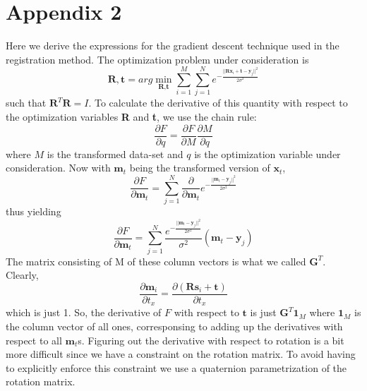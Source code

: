 \documentclass[11pt, a4paper]{article}
\begin{document}
\section*{Appendix 2}
Here we derive the expressions for the gradient descent technique used in the registration method.
\linebreak \linebreak
\noindent The optimization problem under consideration is $$\textbf{R}, \textbf{t} = arg\min_{\textbf{R}, \textbf{t}} \sum_{i=1}^M \sum_{j=1}^N e^{-\frac{|| \textbf{Rx}_i + \textbf{t} - \textbf{y}_j ||^2}{2 \sigma^2}}$$ such that $\textbf{R}^T \textbf{R} = I$. To calculate the derivative of this quantity with respect to the optimization variables \textbf{R} and \textbf{t}, we use the chain rule:
$$\frac{\partial F}{\partial q} = \frac{\partial F}{\partial M} \frac{\partial M}{\partial q}$$ where $M$ is the transformed data-set and $q$ is the optimization variable under consideration. Now with $\textbf{m}_t$ being the transformed version of $\textbf{x}_t$, $$\frac{\partial F}{\partial \textbf{m}_t} = \sum_{j=1}^N \frac{\partial}{\partial \textbf{m}_t} e^{-\frac{|| \textbf{m}_t - \textbf{y}_j ||^2}{2 \sigma^2}}$$ thus yielding $$\frac{\partial F}{\partial \textbf{m}_t} = \sum_{j=1}^N \frac{e^{-\frac{|| \textbf{m}_t - \textbf{y}_j ||^2}{2 \sigma^2}}}{\sigma^2} \left( \textbf{m}_t-\textbf{y}_j \right)$$ The matrix consisting of M of these column vectors is what we called $\textbf{G}^T$.
\newline \linebreak
\noindent Clearly, $$\frac{\partial \textbf{m}_i}{\partial t_x} = \frac{\partial \left(\textbf{Rs}_i + \textbf{t}\right)}{\partial t_x}$$ which is just 1. So, the derivative of $F$ with respect to $\textbf{t}$ is just $\textbf{G}^T \textbf{1}_M$ where $\textbf{1}_M$ is the column vector of all ones, corresponsing to adding up the derivatives with respect to all $\textbf{m}_t$s.
\newline \linebreak
\noindent Figuring out the derivative with respect to rotation is a bit more difficult since we have a constraint on the rotation matrix. To avoid having to explicitly enforce this constraint we use a quaternion parametrization of the rotation matrix. 
\end{document}
